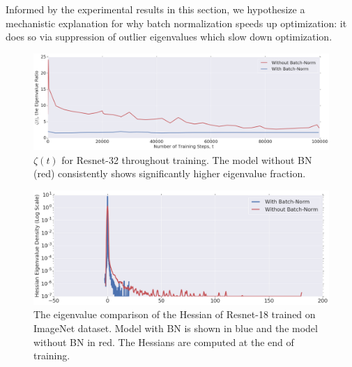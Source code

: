 \documentclass{article}
\begin{document}
Informed by the experimental results in this section, we hypothesize a mechanistic explanation for why batch normalization speeds up optimization: it does so via suppression of outlier eigenvalues which slow down optimization.

\begin{figure}[ht]
\includegraphics[width=\textwidth]{Fraction.png}
\vspace{-0.5cm}
\caption{$\zeta(t)$ for Resnet-32 throughout training. The model without BN (red) consistently shows significantly higher eigenvalue fraction. \label{fig:outlier}}
\end{figure}

\begin{figure}[ht]
\includegraphics[width=\textwidth]{End_Not_Scaled.png}
\vspace{-0.5cm}
\caption{The eigenvalue comparison of the Hessian of Resnet-18 trained on ImageNet dataset. Model with BN is shown in blue and the model without BN in red. The Hessians are computed at the end of training. \label{fig:comparison_bn_Resnet_imagenet}}
\end{figure}
\end{document}
